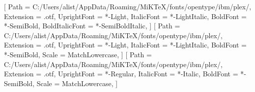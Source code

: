 
\usepackage{microtype}
\usepackage{graphicx}
\usepackage{fontspec}
\usepackage{unicode-math}

\setmainfont{IBMPlexSerif}[
  Path           = C:/Users/alist/AppData/Roaming/MiKTeX/fonts/opentype/ibm/plex/,
  Extension      = .otf,
  UprightFont    = *-Light,
  ItalicFont     = *-LightItalic,
  BoldFont       = *-SemiBold,
  BoldItalicFont = *-SemiBoldItalic,
]
\setsansfont{IBMPlexSans}[
  Path           = C:/Users/alist/AppData/Roaming/MiKTeX/fonts/opentype/ibm/plex/,
  Extension      = .otf,
  UprightFont    = *-Light,
  ItalicFont     = *-LightItalic,
  BoldFont       = *-SemiBold,
  Scale          = MatchLowercase,
]
\setmonofont{IBMPlexMono}[
  Path           = C:/Users/alist/AppData/Roaming/MiKTeX/fonts/opentype/ibm/plex/,
  Extension      = .otf,
  UprightFont    = *-Regular,
  ItalicFont     = *-Italic,
  BoldFont       = *-SemiBold,
  Scale          = MatchLowercase,
]

\usepackage[dvipsnames]{xcolor}

\renewcommand{\baselinestretch}{1.30}

\makeatletter
\renewcommand{\maketitle}{%
  \thispagestyle{empty}\null\vfill
  \begin{flushleft}
    {\Huge\bfseries\color{atlas}\@title\par}\vspace{1em}
    {\Large\itshape\@author\par}\vspace{0.5em}
    {\@date\par}
  \end{flushleft}\vfill\newpage}
\makeatother

\makeatletter
{}
\makeatother
